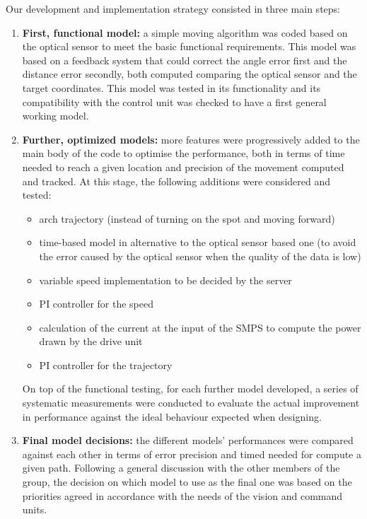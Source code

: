 \documentclass[10pt,twoside]{article}
\begin{document}
 Our development and implementation strategy consisted in three main steps:
 \begin{enumerate}
     \item \textbf{First, functional model:} a simple moving algorithm was coded based on the optical sensor to meet the basic functional requirements. This model was based on a feedback system that could correct the angle error first and the distance error secondly, both computed comparing the optical sensor and the target coordinates. This model was tested in its functionality and its compatibility with the control unit was checked to have a first general working model. 
    \item \textbf{Further, optimized models:} more features were progressively added to the main body of the code to optimise the performance, both in terms of time needed to reach a given location and precision of the movement computed and tracked. At this stage, the following additions were considered and tested:
	     \begin{itemize}
            \item arch trajectory (instead of turning on the spot and moving forward)
	        \item time-based model in alternative to the optical sensor based one (to avoid the error caused by the optical sensor when the quality of the data is low)
            \item variable speed implementation to be decided by the server
            \item PI controller for the speed
            \item calculation of the current at the input of the SMPS to compute the power drawn by the drive unit
            \item PI controller for the trajectory
        \end{itemize}
    On top of the functional testing, for each further model developed, a series of systematic measurements were conducted to evaluate the actual improvement in performance against the ideal behaviour expected when designing. 
    \item \textbf{Final model decisions:} the different models’ performances were compared against each other in terms of error precision and timed needed for compute a given path. Following a general discussion with the other members of the group, the decision on which model to use as the final one was based on the priorities agreed in accordance with the needs of the vision and command units. 
 \end{enumerate}
\end{document}
